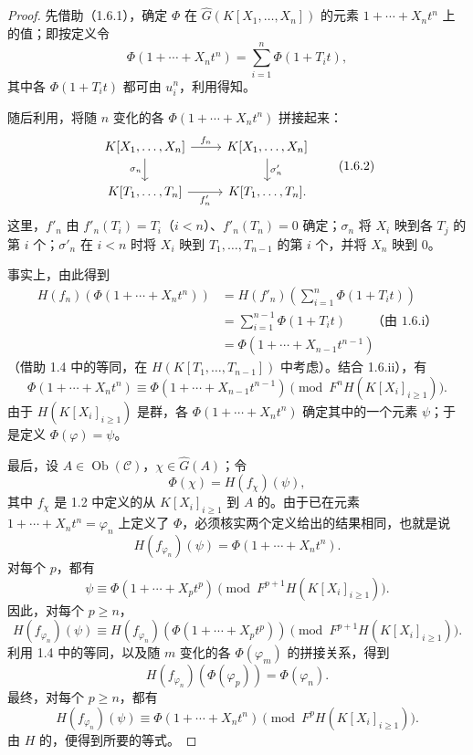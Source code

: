 \begin{proof}
先借助（1.6.1），确定 $\Phi$ 在 $\widehat G(K[X_1,\ldots,X_n])$ 的元素 $1+\cdots+X_nt^n$ 上的值；即按定义令
\[
\Phi(1+\cdots+X_nt^n)=\sum_{i=1}^n\Phi(1+T_it),
\]
其中各 $\Phi(1+T_it)$ 都可由 $u_i^n$，利用得知。

随后利用，将随 $n$ 变化的各 $\Phi(1+\cdots+X_nt^n)$ 拼接起来：
\[
\begin{tikzcd}
K[X_1,\ldots,X_n]\arrow[r,"f_n"]\arrow[d,"\sigma_n"'] &
K[X_1,\ldots,X_n]\arrow[d,"\sigma'_n"]\\
K[T_1,\ldots,T_n]\arrow[r,"f'_n"'] & K[T_1,\ldots,T_n].
\end{tikzcd}
\tag{1.6.2}
\]
这里，$f'_n$ 由 $f'_n(T_i)=T_i$（$i<n$）、$f'_n(T_n)=0$ 确定；$\sigma_n$ 将 $X_i$ 映到各 $T_j$ 的第 $i$ 个；$\sigma'_n$ 在 $i<n$ 时将 $X_i$ 映到 $T_1,\ldots,T_{n-1}$ 的第 $i$ 个，并将 $X_n$ 映到 $0$。

事实上，由此得到
\[
\begin{aligned}
H(f_n)(\Phi(1+\cdots+X_nt^n))
&=H(f'_n)\left(\sum_{i=1}^n\Phi(1+T_it)\right)\\
&=\sum_{i=1}^{n-1}\Phi(1+T_it)\qquad\text{（由 1.6.i）}\\
&=\Phi(1+\cdots+X_{n-1}t^{n-1})
\end{aligned}
\]
（借助 1.4 中的等同，在 $H(K[T_1,\ldots,T_{n-1}])$ 中考虑）。结合 1.6.ii），有
\[
\Phi(1+\cdots+X_nt^n)\equiv\Phi(1+\cdots+X_{n-1}t^{n-1})
\pmod{F^nH(K[X_i]_{i\geqslant1})}.
\]
由于 $H(K[X_i]_{i\geqslant1})$ 是群，各 $\Phi(1+\cdots+X_nt^n)$ 确定其中的一个元素 $\psi$；于是定义 $\Phi(\varphi)=\psi$。

最后，设 $A\in\operatorname{Ob}(\mathscr C)$，$\chi\in\widehat G(A)$；令
\[
\Phi(\chi)=H(f_\chi)(\psi),
\]
其中 $f_\chi$ 是 1.2 中定义的从 $K[X_i]_{i\geqslant1}$ 到 $A$ 的。由于已在元素 $1+\cdots+X_nt^n=\varphi_n$ 上定义了 $\Phi$，必须核实两个定义给出的结果相同，也就是说
\[
H(f_{\varphi_n})(\psi)=\Phi(1+\cdots+X_nt^n).
\]
对每个 $p$，都有
\[
\psi\equiv\Phi(1+\cdots+X_pt^p)\pmod{F^{p+1}H(K[X_i]_{i\geqslant1})}.
\]
因此，对每个 $p\geqslant n$，
\[
H(f_{\varphi_n})(\psi)\equiv
H(f_{\varphi_n})(\Phi(1+\cdots+X_pt^p))
\pmod{F^{p+1}H(K[X_i]_{i\geqslant1})}.
\]
利用 1.4 中的等同，以及随 $m$ 变化的各 $\Phi(\varphi_m)$ 的拼接关系，得到
\[
H(f_{\varphi_n})(\Phi(\varphi_p))=\Phi(\varphi_n).
\]
最终，对每个 $p\geqslant n$，都有
\[
H(f_{\varphi_n})(\psi)\equiv\Phi(1+\cdots+X_nt^n)
\pmod{F^pH(K[X_i]_{i\geqslant1})}.
\]
由 $H$ 的，便得到所要的等式。


\end{proof}
